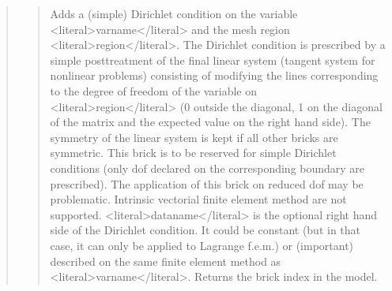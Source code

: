 \documentclass[a4paper,11pt,english]{sphinxmanual}
\begin{document}
\begin{quote}
\begin{quote}
\sphinxAtStartPar
Adds a (simple) Dirichlet condition on the variable \textless{}literal\textgreater{}varname\textless{}/literal\textgreater{} and
the mesh region \textless{}literal\textgreater{}region\textless{}/literal\textgreater{}. The Dirichlet condition is prescribed by
a simple post\sphinxhyphen{}treatment of the final linear system (tangent system
for nonlinear problems) consisting of modifying the lines corresponding
to the degree of freedom of the variable on \textless{}literal\textgreater{}region\textless{}/literal\textgreater{} (0 outside the
diagonal, 1 on the diagonal of the matrix and the expected value on
the right hand side).
The symmetry of the linear system is kept if all other bricks are
symmetric.
This brick is to be reserved for simple Dirichlet conditions (only dof
declared on the corresponding boundary are prescribed). The application
of this brick on reduced dof may be problematic. Intrinsic vectorial
finite element method are not supported.
\textless{}literal\textgreater{}dataname\textless{}/literal\textgreater{} is the optional right hand side of  the Dirichlet condition.
It could be constant (but in that case, it can only be applied to
Lagrange f.e.m.) or (important) described on the same finite
element method as \textless{}literal\textgreater{}varname\textless{}/literal\textgreater{}.
Returns the brick index in the model.
\end{quote}

\sphinxAtStartPar
{}
\begin{quote}


\end{quote}
\end{quote}
\end{document}
